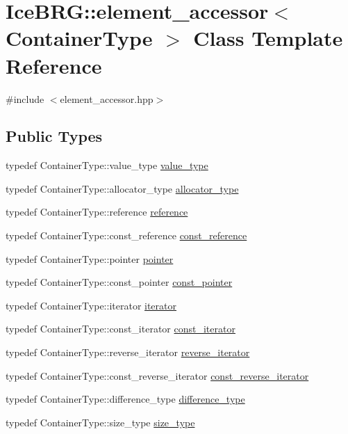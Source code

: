 \hypertarget{classIceBRG_1_1element__accessor}{}\section{Ice\+B\+R\+G\+:\+:element\+\_\+accessor$<$ Container\+Type $>$ Class Template Reference}
\label{classIceBRG_1_1element__accessor}


{\ttfamily \#include $<$element\+\_\+accessor.\+hpp$>$}

\subsection*{Public Types}
\begin{DoxyCompactItemize}
\item 
typedef Container\+Type\+::value\+\_\+type \hyperlink{classIceBRG_1_1element__accessor_ab6c9120cd75bb9ea751fab09967baee9}{value\+\_\+type}
\item 
typedef Container\+Type\+::allocator\+\_\+type \hyperlink{classIceBRG_1_1element__accessor_ad50e47085815aadfb3fa84cd845266ba}{allocator\+\_\+type}
\item 
typedef Container\+Type\+::reference \hyperlink{classIceBRG_1_1element__accessor_ae31e9fe4b35d76ed6055052fb788de13}{reference}
\item 
typedef Container\+Type\+::const\+\_\+reference \hyperlink{classIceBRG_1_1element__accessor_aa5a74be2decaa60d9080c4f1b4d3dcb8}{const\+\_\+reference}
\item 
typedef Container\+Type\+::pointer \hyperlink{classIceBRG_1_1element__accessor_a9d67afd8fb73e97d728564567ff42609}{pointer}
\item 
typedef Container\+Type\+::const\+\_\+pointer \hyperlink{classIceBRG_1_1element__accessor_ad2f50d3e3d10c61c85c167512221c7d1}{const\+\_\+pointer}
\item 
typedef Container\+Type\+::iterator \hyperlink{classIceBRG_1_1element__accessor_a464911efedf30917f238c5fb4746cd09}{iterator}
\item 
typedef Container\+Type\+::const\+\_\+iterator \hyperlink{classIceBRG_1_1element__accessor_ab9a6ca4866a0758171a4ffa7b0935cd2}{const\+\_\+iterator}
\item 
typedef Container\+Type\+::reverse\+\_\+iterator \hyperlink{classIceBRG_1_1element__accessor_a8fc4c41438daa950d66dac2f7613ea18}{reverse\+\_\+iterator}
\item 
typedef Container\+Type\+::const\+\_\+reverse\+\_\+iterator \hyperlink{classIceBRG_1_1element__accessor_a32ea1ca6966b5093370f8944efedc471}{const\+\_\+reverse\+\_\+iterator}
\item 
typedef Container\+Type\+::difference\+\_\+type \hyperlink{classIceBRG_1_1element__accessor_a2f4224314d26679948777aa2b1121148}{difference\+\_\+type}
\item 
typedef Container\+Type\+::size\+\_\+type \hyperlink{classIceBRG_1_1element__accessor_aec3d016f3c5e84e7f9248669a9571208}{size\+\_\+type}
\end{DoxyCompactItemize}
